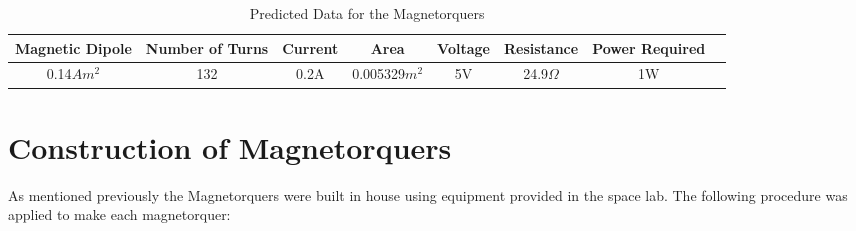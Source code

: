 \begin{table}[H]
\begin{center}
\caption{Predicted Data for the Magnetorquers}
\begin{tabular}{|c|c|c|c|c|c|c|c|}
\hline
Magnetic Dipole & Number of Turns & Current & Area & Voltage & Resistance & Power Required\\
\hline
0.14$Am^2$ & 132 & 0.2A & 0.005329$m^2$ & 5V & 24.9$\Omega$ & 1W\\
\hline
\end{tabular}
\end{center}
\vspace{-6mm}
\end{table}

\section{Construction of Magnetorquers}
As mentioned previously the Magnetorquers were built in house using equipment provided in the space lab.  The following procedure was applied to make each magnetorquer:
